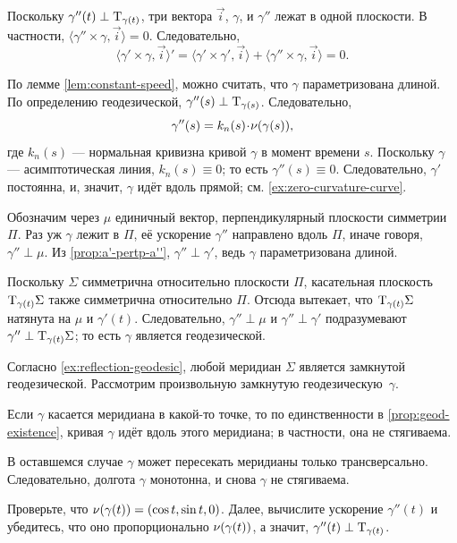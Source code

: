 Поскольку $\gamma''(t)\perp\mathrm{T}_{\gamma(t)}$, три вектора $\vec i$, $\gamma$, и $\gamma''$ лежат в одной плоскости.
В частности, $\langle\gamma''\times \gamma,\vec i\rangle=0$.
Следовательно,
\[
\langle\gamma'\times \gamma,\vec i\rangle'
=
\langle\gamma'\times \gamma',\vec i\rangle+\langle\gamma''\times \gamma,\vec i\rangle =0
.\]

По лемме \ref{lem:constant-speed}, можно считать, что $\gamma$ параметризована длиной.
По определению геодезической, $\gamma''(s)\perp\mathrm{T}_{\gamma(s)}$. 
Следовательно, 
\[\gamma''(s)=k_n(s)\cdot\Norm(\gamma(s)),\]
где $k_n(s)$ --- нормальная кривизна кривой $\gamma$ в момент времени $s$.
Поскольку $\gamma$ --- асимптотическая линия, $k_n(s)\equiv 0$;
то есть $\gamma''(s)\equiv 0$.
Следовательно, $\gamma'$ постоянна, и, значит, $\gamma$ идёт вдоль прямой; см. \ref{ex:zero-curvature-curve}.

Обозначим через $\mu$ единичный вектор, перпендикулярный плоскости симметрии $\Pi$.
Раз уж $\gamma$ лежит в $\Pi$, её ускорение $\gamma''$ направлено вдоль $\Pi$, иначе говоря, $\gamma''\perp \mu$.
Из \ref{prop:a'-pertp-a''}, $\gamma''\perp\gamma'$, ведь $\gamma$ параметризована длиной.

Поскольку $\Sigma$ симметрична относительно плоскости $\Pi$,
касательная плоскость $\mathrm{T}_{\gamma(t)}\Sigma$ также симметрична относительно $\Pi$.
Отсюда вытекает, что $\mathrm{T}_{\gamma(t)}\Sigma$ натянута на $\mu$ и $\gamma'(t)$.
Следовательно, $\gamma''\perp \mu$ и $\gamma''\perp\gamma'$ подразумевают $\gamma''\perp\mathrm{T}_{\gamma(t)}\Sigma$;
то есть $\gamma$ является геодезической.

Согласно \ref{ex:reflection-geodesic}, любой меридиан $\Sigma$ является замкнутой геодезической.
Рассмотрим произвольную замкнутую геодезическую~$\gamma$.

Если $\gamma$ касается меридиана в какой-то точке, то по единственности в \ref{prop:geod-existence}, кривая $\gamma$ идёт вдоль этого меридиана;
в частности, она не стягиваема.

В оставшемся случае $\gamma$ может пересекать меридианы только трансверсально.
Следовательно, долгота $\gamma$ монотонна, и снова $\gamma$ не стягиваема.

Проверьте, что $\Norm(\gamma(t))\z=(\cos t,\sin t,0)$.
Далее, вычислите ускорение $\gamma''(t)$ и убедитесь, что оно пропорционально $\nu(\gamma(t))$,
а значит, $\gamma''(t)\z\perp\T_{\gamma(t)}$. 

